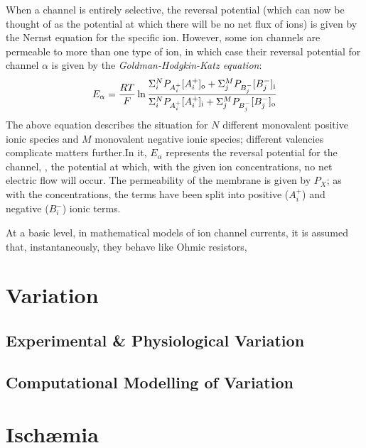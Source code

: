 \documentclass[../thesis-main.tex]{subfiles}
\begin{document}
 When a channel is entirely selective, the reversal potential (which can now be thought of as the potential at which there will be no net flux of ions) is given by the Nernst equation for the specific ion. However, some ion channels are permeable to more than one type of ion, in which case their reversal potential for channel $\alpha$ is given by the \emph{Goldman-Hodgkin-Katz equation}:
 \begin{equation}
  E_\alpha = \frac{RT}{F}\ln\frac{\Sigma_i^N P_{A_i^+}[A_i^+]_\textnormal{o} + \Sigma_j^M P_{B_j^-}[B_j^-]_\textnormal{i}}{\Sigma_i^N P_{A_i^+}[A_i^+]_\textnormal{i} + \Sigma_j^M P_{B_j^-}[B_j^-]_\textnormal{o}}
 \end{equation}
 The above equation describes the situation for $N$ different monovalent positive ionic species and $M$ monovalent negative ionic species; different valencies complicate matters further.In it, $E_\alpha$ represents the reversal potential for the channel, \idest, the potential at which, with the given ion concentrations, no net electric flow will occur. The permeability of the membrane is given by $P_X$; as with the concentrations, the terms have been split into positive ($A_i^+$) and negative ($B_i^-$) ionic terms.
 
 At a basic level, in mathematical models of ion channel currents, it is assumed that, instantaneously, they behave like Ohmic resistors, \idest
 
 \section{Variation}
 \label{sec:param-var}
 
 \subsection{Experimental \& Physiological Variation}
 \label{subsec:experimental-var}
 
 \subsection{Computational Modelling of Variation}
 \label{subsec:comp-var}
 
 \section{Isch\ae mia}
 \label{sec:ischaemia}
 
\end{document}

